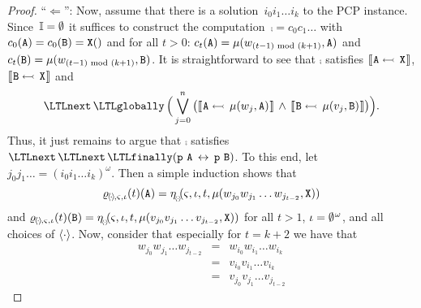 \begin{proof}
  ``$ \Leftarrow $'': Now, assume that there is a
  solution~$ i_{0}i_{1}\ldots i_{k} $ to the PCP instance.
  Since~$ \mathbb{I} = \emptyset $ it suffices to
  construct the computation~$ \comp = c_{0}c_{1}\ldots $ with
  $ c_{0}({\text{\texttt{A}}}) = c_{0}({\text{\texttt{B}}}) = \text{\texttt{X}}() $ and for all
  $ t > 0 $:
  $ c_{t}({\text{\texttt{A}}}) = \mu(w_{(t-1) \!\!\mod (k+1)}, {\text{\texttt{A}}}) $ and
  $ c_{t}({\text{\texttt{B}}}) = \mu(w_{(t-1) \!\!\mod (k+1)}, {\text{\texttt{B}}}) $. It is
  straightforward to see that $ \comp $ satisfies
  $ \mbox{\ensuremath{\llbracket \hspace{0.5pt} {\text{\texttt{A}}} \leftarrowtail \, {\text{\texttt{X}}} \hspace{0.5pt} \rrbracket}} $,
  $ \mbox{\ensuremath{\llbracket \hspace{0.5pt} {\text{\texttt{B}}} \leftarrowtail \, {\text{\texttt{X}}} \hspace{0.5pt} \rrbracket}}$ and
  \begin{equation*}
     \LTLnext \, \LTLglobally \, \Big( \bigvee_{j=0}^{n}
    \big( \upd{\name{A}}{\mu(w_{j},\name{A})} \, \wedge \,
    \upd{\name{B}}{\mu(v_{j},\name{B})} \big) \Big).
  \end{equation*}
  Thus, it just remains to argue that $ \comp $ satisfies
  $ \LTLnext \, \LTLnext \, \LTLfinally ( \name{p}~\name{A} \,
  \leftrightarrow \, \name{p}~\name{B} ) $. To this end, let
  $ j_{0}j_{1}\ldots = (i_{0}i_{1}\ldots i_{k})^{\omega} $. Then a
  simple induction shows that
  \begin{equation*}
    \varrho_{\hspace{-1pt}\langle \hspace{-1pt}\cdot
      \hspace{-1pt}\rangle \hspace{-1pt}, \varsigma, \iota}
    (t)({\text{\texttt{A}}}) =
    \eta_{_{\!\langle \hspace{-1pt} \cdot \hspace{-1pt} \rangle\!}}\!(\varsigma,\iota,t,\mu(w_{j_{0}}w_{j_{1}}\ldots w_{j_{t-2}},{\text{\texttt{X}}}))
  \end{equation*}
  and
  $ \varrho_{\hspace{-1pt}\langle \hspace{-1pt}\cdot
    \hspace{-1pt}\rangle \hspace{-1pt}, \varsigma, \iota}(t)({\text{\texttt{B}}}) =
  \eta_{_{\!\langle \hspace{-1pt} \cdot \hspace{-1pt} \rangle\!}}\!(\varsigma,\iota, t,\mu(v_{j_{0}}v_{j_{1}}\ldots
  v_{j_{t-2}},{\text{\texttt{X}}})) $ for all $ t > 1 $,
  $ \iota = \emptyset^{\hspace{0.5pt}\omega} $, and all choices of
  $ \langle \cdot \rangle $. Now, consider that especially for $ t = k+2 $ we
  have that
  \begin{eqnarray*}
    w_{j_{0}}w_{j_{1}}\ldots w_{j_{t-2}} & =
    & w_{i_{0}}w_{i_{1}}\ldots  w_{i_{k}} \\
    & = & v_{i_{0}}v_{i_{1}}\ldots v_{i_{k}} \\
    & = &  v_{j_{0}}v_{j_{1}}\ldots v_{j_{t-2}}
  \end{eqnarray*}

\end{proof}
